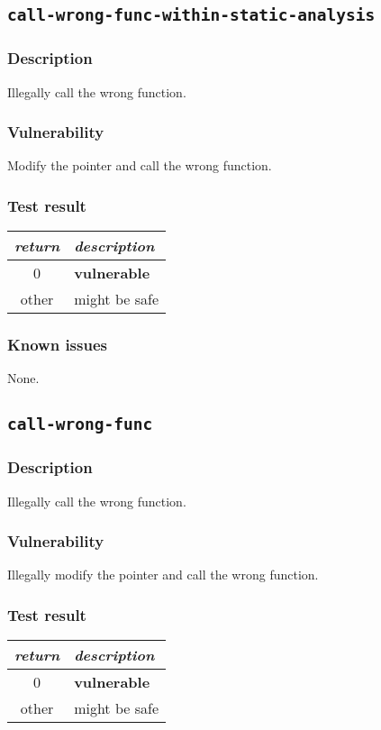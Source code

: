 \documentclass[a4paper]{book}
\begin{document}
\subsection{\texttt{call-wrong-func-within-static-analysis}}\label{test-call-wrong-func-within-static-analysis}

\subsubsection{Description}
Illegally call the wrong function.
\subsubsection{Vulnerability}
Modify the pointer and call the wrong function.

\subsubsection{Test result}
\begin{tabular}{cl}
  \toprule
  \emph{return}  & \emph{description} \\
  \midrule
  0              & \textbf{vulnerable} \\
  other          & might be safe \\
  \bottomrule
\end{tabular}
  
\subsubsection{Known issues}

None.

\newpage

\subsection{\texttt{call-wrong-func}}\label{test-call-wrong-func}

\subsubsection{Description}
Illegally call the wrong function.
\subsubsection{Vulnerability}
Illegally modify the pointer and call the wrong function. 

\subsubsection{Test result}
\begin{tabular}{cl}
  \toprule
  \emph{return}  & \emph{description} \\
  \midrule
  0              & \textbf{vulnerable} \\
  other          & might be safe \\
  \bottomrule
\end{tabular}
  
\end{document}
